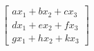 \documentclass[preview]{standalone}
\begin{document}
\begin{align*}
\begin{bmatrix} ax_1 + bx_2 + cx_3 \\ dx_1 + ex_2 + fx_3 \\ gx_1 + hx_2 + kx_3 \end{bmatrix}
\end{align*}
\end{document}
